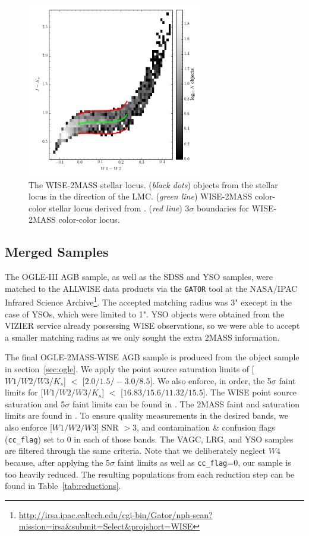 \begin{figure}[h]
\includegraphics[width=3in]{figs/lmc_locus_3sig.png}
\caption{The WISE-2MASS stellar locus. (\emph{black dots}) objects from the stellar locus in the direction of the LMC. (\emph{green line}) WISE-2MASS color-color stellar locus derived from \cite{2014MNRAS.440.3430D}. (\emph{red line}) 3$\sigma$ boundaries for WISE-2MASS color-color locus. \label{fig:locus}}
\end{figure}


\subsection{Merged Samples\label{sec:merged}}
The OGLE-III AGB sample, as well as the SDSS and YSO samples, were matched to the ALLWISE data products via the {\tt GATOR} tool at the NASA/IPAC Infrared Science Archive\footnote{\url{http://irsa.ipac.caltech.edu/cgi-bin/Gator/nph-scan?mission=irsa&submit=Select&projshort=WISE}}. The accepted matching radius was 3" execept in the case of YSOs, which were limited to 1". YSO objects were obtained from the VIZIER service already possessing WISE observations, so we were able to accept a smaller matching radius as we only sought the extra 2MASS information.

The final OGLE-2MASS-WISE AGB sample is produced from the object sample in section~\ref{sec:ogle}. We apply the point source saturation limits of [$W1/W2/W3/K_s$] $<$ [$2.0/1.5/-3.0/8.5$]. We also enforce, in order, the 5$\sigma$ faint limits for [$W1/W2/W3/K_s$]  $<$ [$16.83/15.6/11.32/15.5$]. The WISE point source saturation and 5$\sigma$ faint limits can be found in \cite{2012wise.rept....1C}. The 2MASS faint and saturation limits are found in \cite{2006AJ....131.1163S}. To ensure quality measurements in the desired bands, we also enforce [$W1/W2/W3$] SNR $> 3$, and contamination \& confusion flags ({\tt cc\_flag}) set to 0 in each of those bands. The VAGC, LRG, and YSO samples are filtered through the same criteria. Note that we deliberately neglect $W4$ because, after applying the 5$\sigma$ faint limits as well as {\tt cc\_flag}=0, our sample is too heavily reduced. %
The resulting populations from each reduction step can be found in Table~\ref{tab:reductions}.

